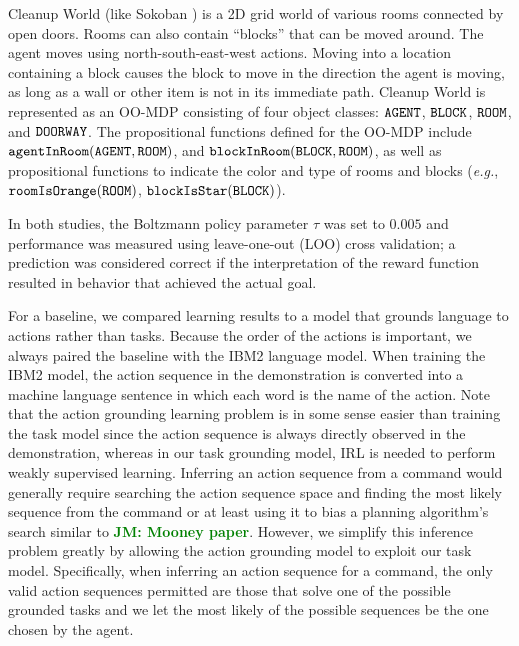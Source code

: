 \documentclass[conference]{IEEEtran}
\newcommand{\jmnote}[1]{\textcolor{Green}{\textbf{JM: #1}}}
\begin{document}
Cleanup World (like Sokoban \cite{junghanns1997sokoban}) is a 2D grid world of various rooms connected by open doors. Rooms can also contain ``blocks'' that can be moved around. The agent moves using north-south-east-west actions. Moving into a location containing a block causes the block to move in the direction the agent is moving, as long as a wall or other item is not in its immediate path. Cleanup World is represented as an OO-MDP consisting of four object classes: ${\tt AGENT}$, ${\tt BLOCK}$, ${\tt ROOM}$, and ${\tt DOORWAY}$. %
The propositional functions defined for the OO-MDP include ${\tt agentInRoom}({\tt AGENT}, {\tt ROOM})$, and ${\tt blockInRoom}({\tt BLOCK}, {\tt ROOM})$, as well as propositional functions to indicate the color and type of rooms and blocks (\emph{e.g.}, ${\tt roomIsOrange}({\tt ROOM})$, ${\tt blockIsStar}({\tt BLOCK})$).

In both studies, the Boltzmann policy parameter $\tau$ was set to $0.005$ and performance was measured using leave-one-out (LOO) cross validation; a prediction was considered correct if the interpretation of the reward function resulted in behavior that achieved the actual goal. 

For a baseline, we compared learning results to a model that grounds language to actions rather than tasks. Because the order of the actions is important, we always paired the baseline with the IBM2 language model. When training the IBM2 model, the action sequence in the demonstration is converted into a machine language sentence in which each word is the name of the action. Note that the action grounding learning problem is in some sense easier than training the task model since the action sequence is always directly observed in the demonstration, whereas in our task grounding model, IRL is needed to perform weakly supervised learning. Inferring an action sequence from a command would generally require searching the action sequence space and finding the most likely sequence from the command or at least using it to bias a planning algorithm's search similar to \jmnote{Mooney paper}. However, we simplify this inference problem greatly by allowing the action grounding model to exploit our task model. Specifically, when inferring an action sequence for a command, the only valid action sequences permitted are those that solve one of the possible grounded tasks and we let the most likely of the possible sequences be the one chosen by the agent.
\end{document}
